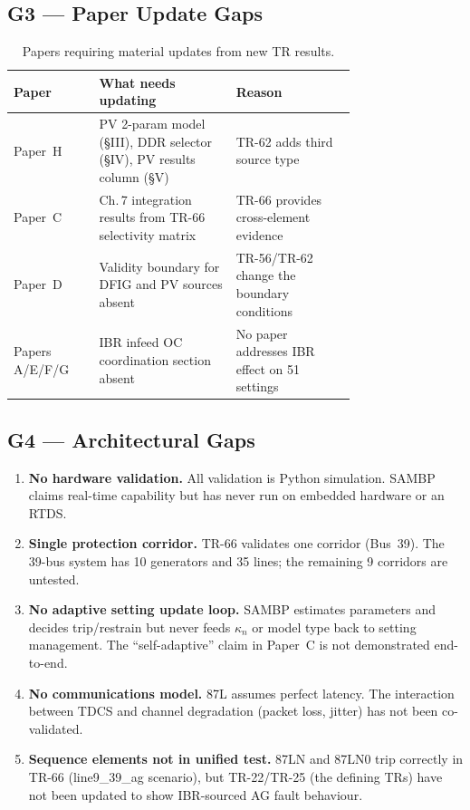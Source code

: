\documentclass[12pt,a4paper]{article}
\newcommand{\kn}{\kappa_n}
\begin{document}
\subsection{G3 — Paper Update Gaps}

\begin{table}[H]
\centering
\caption{Papers requiring material updates from new TR results.}
\begin{tabular}{lp{0.40\linewidth}p{0.35\linewidth}}
\toprule
Paper & What needs updating & Reason \\
\midrule
Paper~H & PV 2-param model (§III), DDR selector (§IV), PV results column (§V) & TR-62 adds third source type \\
Paper~C & Ch.\,7 integration results from TR-66 selectivity matrix & TR-66 provides cross-element evidence \\
Paper~D & Validity boundary for DFIG and PV sources absent & TR-56/TR-62 change the boundary conditions \\
Papers A/E/F/G & IBR infeed OC coordination section absent & No paper addresses IBR effect on 51 settings \\
\bottomrule
\end{tabular}
\end{table}

\subsection{G4 — Architectural Gaps}

\begin{enumerate}
  \item \textbf{No hardware validation.}  All validation is Python simulation.
    SAMBP claims real-time capability but has never run on embedded hardware or an RTDS.
  \item \textbf{Single protection corridor.}  TR-66 validates one corridor (Bus~39).
    The 39-bus system has 10 generators and 35 lines; the remaining 9 corridors are untested.
  \item \textbf{No adaptive setting update loop.}  SAMBP estimates parameters and
    decides trip/restrain but never feeds $\kn$ or model type back to setting management.
    The ``self-adaptive'' claim in Paper~C is not demonstrated end-to-end.
  \item \textbf{No communications model.}  87L assumes perfect latency.  The interaction
    between TDCS and channel degradation (packet loss, jitter) has not been co-validated.
  \item \textbf{Sequence elements not in unified test.}  87LN and 87LN0 trip correctly in
    TR-66 (line9\_39\_ag scenario), but TR-22/TR-25 (the defining TRs) have not been
    updated to show IBR-sourced AG fault behaviour.
\end{enumerate}
\end{document}
